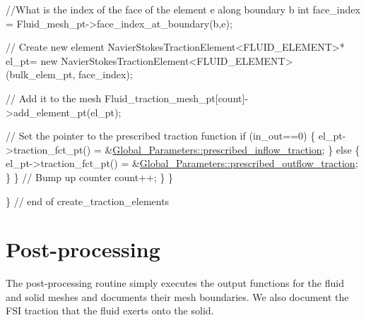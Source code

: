 \begin{DoxyCodeInclude}
       \textcolor{comment}{//What is the index of the face of the element e along boundary b}
       \textcolor{keywordtype}{int} face\_index = Fluid\_mesh\_pt->face\_index\_at\_boundary(b,e);
       
       \textcolor{comment}{// Create new element }
       NavierStokesTractionElement<FLUID\_ELEMENT>* el\_pt=
        \textcolor{keyword}{new} NavierStokesTractionElement<FLUID\_ELEMENT>(bulk\_elem\_pt,
                                                       face\_index);
       
       \textcolor{comment}{// Add it to the mesh}
       Fluid\_traction\_mesh\_pt[count]->add\_element\_pt(el\_pt);
         
       \textcolor{comment}{// Set the pointer to the prescribed traction function}
       \textcolor{keywordflow}{if} (in\_out==0)
        \{
         el\_pt->traction\_fct\_pt() = 
          &\hyperlink{namespaceGlobal__Parameters_af7faf65214ed9ead637f7c208addb095}{Global\_Parameters::prescribed\_inflow\_traction};
        \}
       \textcolor{keywordflow}{else}
        \{ 
         el\_pt->traction\_fct\_pt() = 
          &\hyperlink{namespaceGlobal__Parameters_a83155358b144cff7e29ecb6b209a2d3e}{Global\_Parameters::prescribed\_outflow\_traction};
        \}
      \}
     \textcolor{comment}{// Bump up counter}
     count++;
    \}
  \}
 
 \} \textcolor{comment}{// end of create\_traction\_elements}

\end{DoxyCodeInclude}




 

\hypertarget{index_doc_solution}{}\section{Post-\/processing}\label{index_doc_solution}
The post-\/processing routine simply executes the output functions for the fluid and solid meshes and documents their mesh boundaries. We also document the F\+SI traction that the fluid exerts onto the solid.


